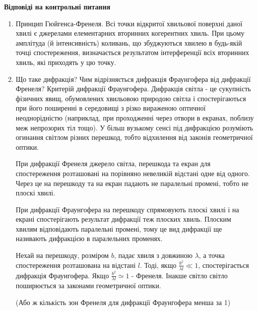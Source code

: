 \pagebreak

\begin{center}
    \Large{\textbf{Відповіді на контрольні питання}}    
\end{center}

\vspace{1mm}

\begin{enumerate}
    \item Принцип Гюйгенса-Френеля.
    \bigbreak
    Всі точки відкритої хвильової поверхні даної хвилі є
    джерелами елементарних вторинних когерентних хвиль.
    При цьому амплітуда (й інтенсивність) коливань, що збуджуються
    хвилею в будь-якій точці спостереження, визначається результатом
    інтерференції всіх вторинних хвиль, які приходять у цю точку.

    \item Що таке дифракція? Чим відрізняється дифракція Фраунгофера від дифракції
    Френеля? Критерій дифракції Фраунгофера.
    \bigbreak
    Дифракція світла - це сукупність фізичних явищ, обумовлених хвильовою природою світла і спостерігаються при його поширенні в середовищі з
    різко вираженою оптичної неоднорідністю (наприклад, при проходженні 
    через отвори в екранах, поблизу меж непрозорих тіл тощо). У більш вузькому
    сенсі під дифракцією розуміють огинання світлом різних перешкод, 
    тобто відхилення від законів геометричної оптики.

    При дифракції Френеля джерело світла, перешкода та екран для
    спостереження розташовані на порівняно невеликій відстані одне 
    від одного. Через це на перешкоду та на екран падають не паралельні
    промені, тобто не плоскі хвилі.

    При дифракції Фраунгофера на перешкоду спрямовують 
    плоскі хвилі і на екрані спостерігають результат дифракції теж 
    плоских хвиль. Плоским хвилям відповідають паралельні промені,
    тому це вид дифракції ще називають дифракцією в паралельних променях.

    Нехай на перешкоду, розміром $b$, падає хвиля з довжиною
    $\lambda$, а точка спостереження розташована на відстані $l$.
    Тоді, якщо $ \frac{b^2}{\lambda l} \ll 1 $, спостерігається
    дифракція Фраунгофера. Якщо $ \frac{b^2}{\lambda l} \simeq 1 $ - Френеля. Інакше світло
    світло поширюється за законами геометричної оптики.

    (Або ж кількість зон Френеля для дифракції Фраунгофера менша за 1)


\end{enumerate}
